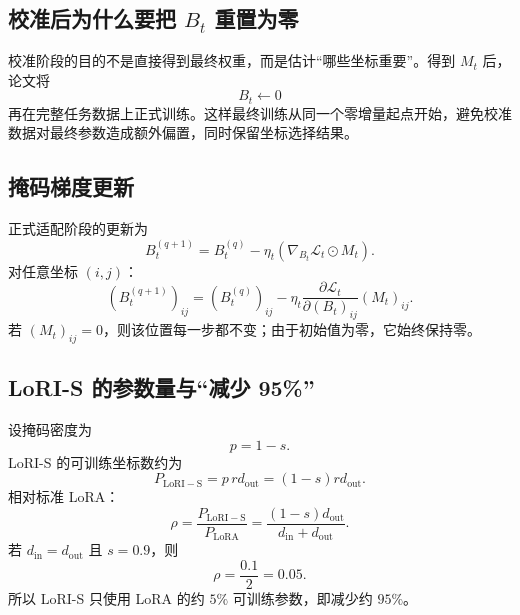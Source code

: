 \documentclass[UTF8,12pt,a4paper,fontset=none]{ctexart}
\numberwithin{equation}{section}
\newcommand{\Loss}{\mathcal{L}}
\begin{document}
\subsection{校准后为什么要把 \texorpdfstring{$B_t$}{B t} 重置为零}

校准阶段的目的不是直接得到最终权重，而是估计“哪些坐标重要”。得到 $M_t$ 后，论文将
\begin{equation}
  B_t\leftarrow 0
\end{equation}
再在完整任务数据上正式训练。这样最终训练从同一个零增量起点开始，避免校准数据对最终参数造成额外偏置，同时保留坐标选择结果。

\subsection{掩码梯度更新}

正式适配阶段的更新为
\begin{equation}
  B_t^{(q+1)}
  =B_t^{(q)}-
  \eta_t\left(
  \nabla_{B_t}\Loss_t\odot M_t
  \right).
  \label{eq:masked-gradient}
\end{equation}
对任意坐标 $(i,j)$：
\begin{equation}
  (B_t^{(q+1)})_{ij}
  =(B_t^{(q)})_{ij}
  -\eta_t
  \frac{\partial\Loss_t}{\partial(B_t)_{ij}}
  (M_t)_{ij}.
\end{equation}
若 $(M_t)_{ij}=0$，则该位置每一步都不变；由于初始值为零，它始终保持零。

\subsection{LoRI-S 的参数量与“减少 95\%”}

设掩码密度为
\begin{equation}
  p=1-s.
\end{equation}
LoRI-S 的可训练坐标数约为
\begin{equation}
  P_{\mathrm{LoRI-S}}
  =p\,r d_{\mathrm{out}}
  =(1-s)r d_{\mathrm{out}}.
  \label{eq:lori-s-param}
\end{equation}
相对标准 LoRA：
\begin{equation}
  \rho
  =\frac{P_{\mathrm{LoRI-S}}}{P_{\mathrm{LoRA}}}
  =\frac{(1-s)d_{\mathrm{out}}}{d_{\mathrm{in}}+d_{\mathrm{out}}}.
\end{equation}
若 $d_{\mathrm{in}}=d_{\mathrm{out}}$ 且 $s=0.9$，则
\begin{equation}
  \rho=\frac{0.1}{2}=0.05.
\end{equation}
所以 LoRI-S 只使用 LoRA 的约 $5\%$ 可训练参数，即减少约 $95\%$。
\end{document}
